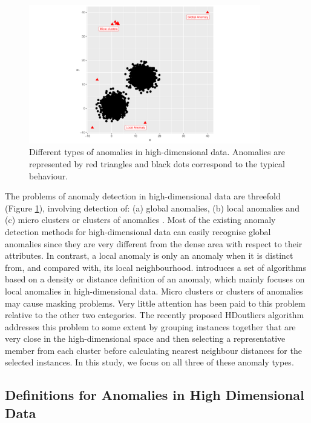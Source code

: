 \documentclass[11pt,a4paper,]{article}
\theoremstyle{definition}
\theoremstyle{definition}
\theoremstyle{definition}
\theoremstyle{remark}
\begin{document}
\begin{figure}[h]

{\centering \includegraphics[width=0.9\textwidth]{figure/outtype-1} 

}

\caption{Different types of anomalies in high-dimensional data. Anomalies are represented by red triangles and black dots correspond to the typical behaviour.}\label{fig:outtype}
\end{figure}

The problems of anomaly detection in high-dimensional data are threefold (Figure \ref{fig:outtype}), involving detection of: (a) global anomalies, (b) local anomalies and (c) micro clusters or clusters of anomalies \autocite{goldstein2016comparative}. Most of the existing anomaly detection methods for high-dimensional data can easily recognise global anomalies since they are very different from the dense area with respect to their attributes. In contrast, a local anomaly is only an anomaly when it is distinct from, and compared with, its local neighbourhood. \textcite{madsen2018ddoutlier} introduces a set of algorithms based on a density or distance definition of an anomaly, which mainly focuses on local anomalies in high-dimensional data. Micro clusters or clusters of anomalies may cause masking problems. Very little attention has been paid to this problem relative to the other two categories. The recently proposed HDoutliers algorithm \autocite{wilkinson2017visualizing} addresses this problem to some extent by grouping instances together that are very close in the high-dimensional space and then selecting a representative member from each cluster before calculating nearest neighbour distances for the selected instances. In this study, we focus on all three of these anomaly types.

\hypertarget{definitions-for-anomalies-in-high-dimensional-data}{%
\subsection{Definitions for Anomalies in High Dimensional Data}\label{definitions-for-anomalies-in-high-dimensional-data}}
\end{document}
